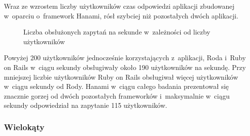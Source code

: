 \documentclass[printmode]{mgr}
\begin{document}
Wraz ze wzrostem liczby użytkowników czas odpowiedzi aplikacji zbudowanej w~oparciu o~framework Hanami, rósł szybciej niż pozostałych dwóch aplikacji.

\begin{figure}[H]
  \centering
  \caption{Liczba obsłużonych zapytań na sekunde w~zależności od liczby użytkowników}
  \label{fig:load_rps_line}
\end{figure}

Powyżej 200 użytkowników jednocześnie korzystających z~aplikacji, Roda i~Ruby on Rails w~ciągu sekundy obsługiwały około 190 użytkowników na sekundę. Przy mniejszej liczbie użytkowników Ruby on Rails obsługiwał więcej użytkowników w~ciągu sekundy od Rody. Hanami w~ciągu całego badania prezentował się znacznie gorzej od dwóch pozostałych frameworków i~maksymalnie w~ciągu sekundy odpowiedział na zapytanie 115 użytkowników.

\subsubsection{Wielokąty}
\end{document}
